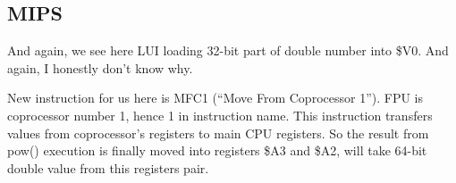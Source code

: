 \ifx\RUSSIAN\undefined
\subsection{MIPS}



And again, we see here LUI loading 32-bit part of double number into \$V0.
And again, I honestly don't know why.

New instruction for us here is MFC1 (``Move From Coprocessor 1''). 
FPU is coprocessor number 1, hence 1 in instruction name.
This instruction transfers values from coprocessor's registers to main CPU registers.
So the result from pow() execution is finally moved into registers \$A3 and \$A2, 
\printf will take 64-bit double value from this registers pair.

\fi
